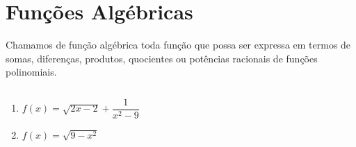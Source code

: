 \section{Funções Algébricas}
\begin{frame}
  \begin{definition}
    Chamamos de função algébrica toda função que possa ser expressa em termos de somas, diferenças, produtos, quocientes ou potências racionais de funções polinomiais.
  \end{definition}
  \begin{columns}[onlytextwidth]
    \begin{column}{0.7\textwidth}
      \begin{example-highlight}
        \begin{enumerate}
          \item $f(x) = \sqrt{2x-2} + \dfrac{1}{x^{2} - 9}$
          \item $f(x) = \sqrt{9-x^2}$
        \end{enumerate}
      \end{example-highlight}
    \end{column}
    \begin{column}{0.3\textwidth}
    \end{column}
  \end{columns}
\end{frame}

